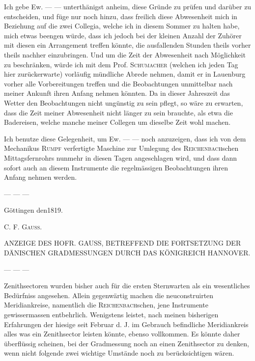 \par
{}%
Ich gebe Ew. — — unterthänigst anheim, diese Gründe zu prüfen und darüber zu entscheiden, und füge nur noch hinzu, dass freilich diese Abwesenheit mich in Beziehung auf die zwei Collegia, welche ich in diesem Sommer zu halten habe, mich etwas beengen würde, dass ich jedoch bei der kleinen Anzahl der Zuhörer mit diesen ein Arrangement treffen könnte, die ausfallenden Stunden theils vorher theils nachher einzubringen. Und um die Zeit der Abwesenheit nach Möglichkeit zu beschränken, würde ich mit dem Prof. \textsc{Schumacher} (welchen ich jeden Tag hier zurückerwarte) vorläufig mündliche Abrede nehmen, damit er in Lauenburg vorher alle Vorbereitungen treffen und die Beobachtungen unmittelbar nach meiner Ankunft ihren Anfang nehmen könnten. Da in dieser Jahreszeit das Wetter den Beobachtungen nicht ungünstig zu sein pflegt, so wäre zu erwarten, dass die Zeit meiner Abwesenheit nicht länger zu sein brauchte, als etwa die Badereisen, welche manche meiner Collegen um dieselbe Zeit wohl machen.

Ich benutze diese Gelegenheit, um Ew. — — noch anzuzeigen, dass ich von dem Mechanikus \textsc{Rumpf} verfertigte Maschine zur Umlegung des \textsc{Reichenbach}schen Mittagsfernrohrs nunmehr in diesen Tagen angeschlagen wird, und dass dann sofort auch an diesem Instrumente die regelmässigen Beobachtungen ihren Anfang nehmen werden.

— — —

Göttingen den\hspace{3em}1819.
\begin{flushright}C. F. \textsc{Gauss}.\end{flushright}

\par\bigskip
{}
\begin{center}\large ANZEIGE DES HOFR. GAUSS, BETREFFEND DIE FORTSETZUNG DER DÄNISCHEN GRADMESSUNGEN DURCH DAS KÖNIGREICH HANNOVER.\end{center}
\par
— — —

Zenithsectoren wurden bisher auch für die ersten Sternwarten als ein wesentliches Bedürfniss angesehen. Allein gegenwärtig machen die neuconstruirten Meridiankreise, namentlich die \textsc{Reichenbach}schen, jene Instrumente gewissermassen entbehrlich. Wenigstens leistet, nach meinen bisherigen Erfahrungen der hiesige seit Februar d. J. im Gebrauch befindliche Meridiankreis alles was ein Zenithsector leisten könnte, ebenso vollkommen. Es könnte daher überflüssig scheinen, bei der Gradmessung noch an einen Zenithsector zu denken, wenn nicht folgende zwei wichtige Umstände noch zu berücksichtigen wären.

